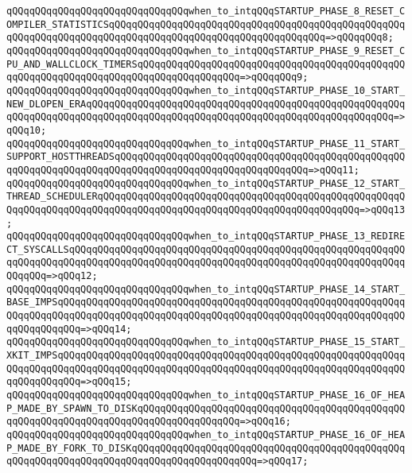 \verb|qQQqqQQqqQQqqQQqqQQqqQQqqQQqqQQqwhen_to_intqQQqSTARTUP_PHASE_8_RESET_COMPILER_STATISTICSqQQqqQQqqQQqqQQqqQQqqQQqqQQqqQQqqQQqqQQqqQQqqQQqqQQqqQQqqQQqqQQqqQQqqQQqqQQqqQQqqQQqqQQqqQQqqQQqqQQqqQQqqQQq=>qQQqqQQq8;|\newline
\verb|qQQqqQQqqQQqqQQqqQQqqQQqqQQqqQQqwhen_to_intqQQqSTARTUP_PHASE_9_RESET_CPU_AND_WALLCLOCK_TIMERSqQQqqQQqqQQqqQQqqQQqqQQqqQQqqQQqqQQqqQQqqQQqqQQqqQQqqQQqqQQqqQQqqQQqqQQqqQQqqQQqqQQqqQQq=>qQQqqQQq9;|\newline
\verb|qQQqqQQqqQQqqQQqqQQqqQQqqQQqqQQqwhen_to_intqQQqSTARTUP_PHASE_10_START_NEW_DLOPEN_ERAqQQqqQQqqQQqqQQqqQQqqQQqqQQqqQQqqQQqqQQqqQQqqQQqqQQqqQQqqQQqqQQqqQQqqQQqqQQqqQQqqQQqqQQqqQQqqQQqqQQqqQQqqQQqqQQqqQQqqQQqqQQq=>qQQq10;|\newline
\verb|qQQqqQQqqQQqqQQqqQQqqQQqqQQqqQQqwhen_to_intqQQqSTARTUP_PHASE_11_START_SUPPORT_HOSTTHREADSqQQqqQQqqQQqqQQqqQQqqQQqqQQqqQQqqQQqqQQqqQQqqQQqqQQqqQQqqQQqqQQqqQQqqQQqqQQqqQQqqQQqqQQqqQQqqQQqqQQqqQQq=>qQQq11;|\newline
\verb|qQQqqQQqqQQqqQQqqQQqqQQqqQQqqQQqwhen_to_intqQQqSTARTUP_PHASE_12_START_THREAD_SCHEDULERqQQqqQQqqQQqqQQqqQQqqQQqqQQqqQQqqQQqqQQqqQQqqQQqqQQqqQQqqQQqqQQqqQQqqQQqqQQqqQQqqQQqqQQqqQQqqQQqqQQqqQQqqQQqqQQqqQQq=>qQQq13;|\newline
\verb|qQQqqQQqqQQqqQQqqQQqqQQqqQQqqQQqwhen_to_intqQQqSTARTUP_PHASE_13_REDIRECT_SYSCALLSqQQqqQQqqQQqqQQqqQQqqQQqqQQqqQQqqQQqqQQqqQQqqQQqqQQqqQQqqQQqqQQqqQQqqQQqqQQqqQQqqQQqqQQqqQQqqQQqqQQqqQQqqQQqqQQqqQQqqQQqqQQqqQQqqQQqqQQq=>qQQq12;|\newline
\verb|qQQqqQQqqQQqqQQqqQQqqQQqqQQqqQQqwhen_to_intqQQqSTARTUP_PHASE_14_START_BASE_IMPSqQQqqQQqqQQqqQQqqQQqqQQqqQQqqQQqqQQqqQQqqQQqqQQqqQQqqQQqqQQqqQQqqQQqqQQqqQQqqQQqqQQqqQQqqQQqqQQqqQQqqQQqqQQqqQQqqQQqqQQqqQQqqQQqqQQqqQQqqQQqqQQq=>qQQq14;|\newline
\verb|qQQqqQQqqQQqqQQqqQQqqQQqqQQqqQQqwhen_to_intqQQqSTARTUP_PHASE_15_START_XKIT_IMPSqQQqqQQqqQQqqQQqqQQqqQQqqQQqqQQqqQQqqQQqqQQqqQQqqQQqqQQqqQQqqQQqqQQqqQQqqQQqqQQqqQQqqQQqqQQqqQQqqQQqqQQqqQQqqQQqqQQqqQQqqQQqqQQqqQQqqQQqqQQqqQQq=>qQQq15;|\newline
\verb|qQQqqQQqqQQqqQQqqQQqqQQqqQQqqQQqwhen_to_intqQQqSTARTUP_PHASE_16_OF_HEAP_MADE_BY_SPAWN_TO_DISKqQQqqQQqqQQqqQQqqQQqqQQqqQQqqQQqqQQqqQQqqQQqqQQqqQQqqQQqqQQqqQQqqQQqqQQqqQQqqQQqqQQqqQQq=>qQQq16;|\newline
\verb|qQQqqQQqqQQqqQQqqQQqqQQqqQQqqQQqwhen_to_intqQQqSTARTUP_PHASE_16_OF_HEAP_MADE_BY_FORK_TO_DISKqQQqqQQqqQQqqQQqqQQqqQQqqQQqqQQqqQQqqQQqqQQqqQQqqQQqqQQqqQQqqQQqqQQqqQQqqQQqqQQqqQQqqQQqqQQq=>qQQq17;|\newline
